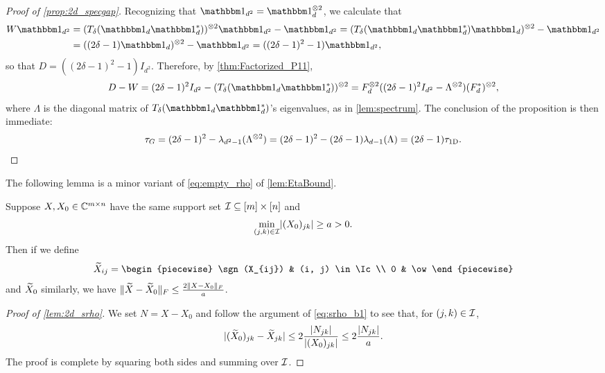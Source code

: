 \begin{proof}[Proof of \cref{prop:2d_specgap}]
  Recognizing that $\one_{d^2} = \one_d^{\kron 2}$, we calculate that
  \begin{align*}
    W \one_{d^2} &= (T_\delta(\one_d \one_d^*))^{\kron 2} \one_{d^2} - \one_{d^2} = (T_\delta(\one_d \one_d^*) \one_d)^{\kron 2} - \one_{d^2} \\
    &= ((2 \delta - 1) \one_d)^{\kron 2} - \one_{d^2} = ((2 \delta - 1)^2 - 1) \one_{d^2},
  \end{align*}
  so that $D = ((2 \delta - 1)^2 - 1) I_{d^2}$.  Therefore, by \cref{thm:Factorized_P11}, \[D - W = (2 \delta - 1)^2 I_{d^2} - (T_\delta(\one_d \one_d^*))^{\kron 2} = F_d^{\kron 2} ((2 \delta - 1)^2 I_{d^2} - \Lambda^{\kron 2}) (F_d^*)^{\kron 2},\] where $\Lambda$ is the diagonal matrix of $T_\delta(\one_d \one_d^*)$'s eigenvalues, as in \cref{lem:spectrum}.  The conclusion of the proposition is then immediate: \[\tau_G = (2 \delta - 1)^2 - \lambda_{d^2 - 1}(\Lambda^{\otimes 2}) = (2 \delta - 1)^2 - (2 \delta - 1) \lambda_{d - 1}(\Lambda) = (2 \delta - 1) \tau_{\rm 1D}.\]
\end{proof}
The following lemma is a minor variant of \eqref{eq:empty_rho} of \cref{lem:EtaBound}.
\begin{lemma} \label{lem:2d_srho}
  Suppose $X, X_0 \in \mathbb{C}^{m \times n}$ have the same support set $\mathcal{I} \subseteq [m] \times [n]$ and \[\min_{(j, k) \in \mathcal{I}} \lvert(X_0)_{jk}\rvert \ge a > 0.\]  Then if we define \[\tX_{ij} = \begin{piecewise} \sgn(X_{ij}) & (i, j) \in \Ic \\ 0 & \ow \end{piecewise}\] and $\widetilde{X}_0$ similarly, we have $\lVert\widetilde{X} - \widetilde{X}_0\rVert_F \le \frac{2 \lVert X - X_0\rVert_F}{a}$.
\end{lemma}

\begin{proof}[Proof of \cref{lem:2d_srho}]
  We set $N = X - X_0$ and follow the argument of \eqref{eq:srho_b1} to see that, for $(j, k) \in \mathcal{I}$, \[\lvert(\widetilde{X}_0)_{jk} - \widetilde{X}_{jk}\rvert \le 2 \dfrac{\lvert N_{jk}\rvert}{\lvert(X_0)_{jk}\rvert} \le 2 \dfrac{\lvert N_{jk}\rvert}{a}.\]  The proof is complete by squaring both sides and summing over $\mathcal{I}$.
\end{proof}


